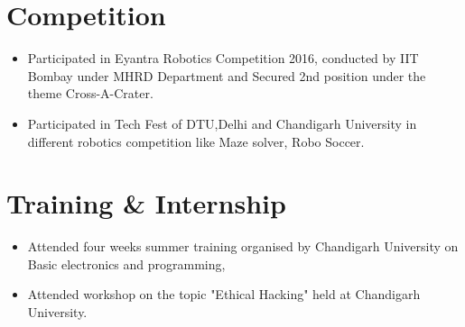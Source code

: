 \documentclass[11pt,a4paper]{article}
\begin{document}
\section*{Competition}
\vspace{-0.7em}\hline \vspace{1.5em}
\begin{itemize}
\item Participated in Eyantra Robotics Competition 2016, conducted by IIT Bombay under MHRD Department and Secured 2nd position under the theme Cross-A-Crater.
\item Participated in Tech Fest of DTU,Delhi and Chandigarh University in different robotics competition like Maze solver, Robo Soccer.
\end{itemize}


\section*{Training \& Internship}
\vspace{-0.7em}\hline \vspace{1.5em}
\begin{itemize}
\item Attended four weeks summer training organised by Chandigarh University on Basic electronics and programming,
\item Attended workshop on the topic "Ethical Hacking" held at Chandigarh University.

\end{itemize}
\end{document}

